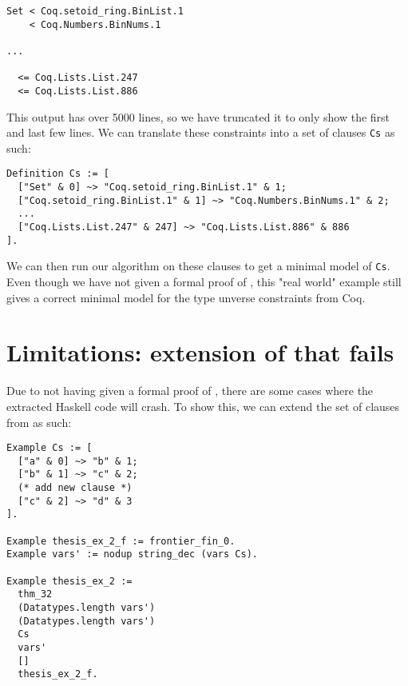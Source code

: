 \begin{minipage}{\linewidth}
\begin{lstlisting}[language=Coq, label={lst:universe_hierarchy}, caption={Universe hierarchy in \lstinline{Main.v}}]
Set < Coq.setoid_ring.BinList.1
    < Coq.Numbers.BinNums.1

...

  <= Coq.Lists.List.247
  <= Coq.Lists.List.886
\end{lstlisting}
\end{minipage}

This output has over 5000 lines, so we have truncated it to only show the first and last few lines.
We can translate these constraints into a set of clauses \lstinline{Cs} as such:

\begin{minipage}{\linewidth}
\begin{lstlisting}[language=Coq, label={lst:universe_hierarchy_clauses}, caption={Universe hierarchy as clauses}]
Definition Cs := [
  ["Set" & 0] ~> "Coq.setoid_ring.BinList.1" & 1;
  ["Coq.setoid_ring.BinList.1" & 1] ~> "Coq.Numbers.BinNums.1" & 2;
  ...
  ["Coq.Lists.List.247" & 247] ~> "Coq.Lists.List.886" & 886
].
\end{lstlisting}
\end{minipage}

We can then run our algorithm on these clauses to get a minimal model of \lstinline{Cs}.
Even though we have not given a formal proof of ,
this "real world" example still gives a correct minimal model for the type unverse constraints from Coq.

\section{Limitations: extension of  that fails}
\label{sec:limitations}

Due to not having given a formal proof of ,
there are some cases where the extracted Haskell code will crash.
To show this, we can extend the set of clauses from  as such:

\begin{minipage}{\linewidth}
\begin{lstlisting}[language=Coq, label={lst:thm_32_coq_example_extended}, caption={\lstinline{thm_32} example extended}]
Example Cs := [
  ["a" & 0] ~> "b" & 1;
  ["b" & 1] ~> "c" & 2;
  (* add new clause *)
  ["c" & 2] ~> "d" & 3
].

Example thesis_ex_2_f := frontier_fin_0.
Example vars' := nodup string_dec (vars Cs).

Example thesis_ex_2 :=
  thm_32
  (Datatypes.length vars')
  (Datatypes.length vars')
  Cs
  vars'
  []
  thesis_ex_2_f.
\end{lstlisting}
\end{minipage}

